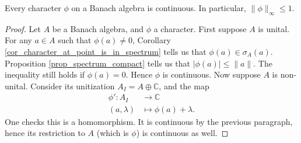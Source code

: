 \documentclass[12pt]{article}
\begin{document}
\begin{proposition} %
\label{prop_characters_cts}
	Every character $\phi$ on a Banach algebra is continuous. In particular, $\|\phi\|_\infty \leq 1$.
\end{proposition}
\begin{proof}
	Let $A$ be a Banach algebra, and $\phi$ a character. First suppose $A$ is unital. For any $a\in A$ such that $\phi(a)\neq 0$, Corollary \ref{cor_character_at_point_is_in_spectrum} tells us that $\phi(a)\in\sigma_A(a)$. Proposition \ref{prop_spectrum_compact} tells us that $|\phi(a)| \leq \|a\|$. The inequality still holds if $\phi(a)=0$. Hence  $\phi$ is continuous.
	Now suppose $A$ is non-unital. Consider its unitization  $A_I=A\oplus \mathbb{C}$, and the map 
	\begin{align*}
		\phi': A_I &\longrightarrow \mathbb{C} \\
		(a,\lambda) &\mapsto \phi(a) + \lambda.
	\end{align*}
	One checks this is a homomorphism. It is continuous by the previous paragraph, hence its restriction to $A$ (which is $\phi$) is continuous as well.
\end{proof}
\end{document}
